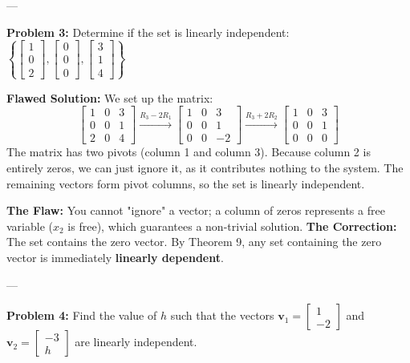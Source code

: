 \documentclass[11pt]{article}
\begin{document}
---

\textbf{Problem 3:} Determine if the set is linearly independent: 
$\left\{ \begin{bmatrix} 1 \\ 0 \\ 2 \end{bmatrix}, \begin{bmatrix} 0 \\ 0 \\ 0 \end{bmatrix}, \begin{bmatrix} 3 \\ 1 \\ 4 \end{bmatrix} \right\}$

\textbf{Flawed Solution:}
We set up the matrix:
\[
\begin{bmatrix}
1 & 0 & 3 \\
0 & 0 & 1 \\
2 & 0 & 4 
\end{bmatrix}
\xrightarrow{R_3 - 2R_1}
\begin{bmatrix}
1 & 0 & 3 \\
0 & 0 & 1 \\
0 & 0 & -2 
\end{bmatrix}
\xrightarrow{R_3 + 2R_2}
\begin{bmatrix}
1 & 0 & 3 \\
0 & 0 & 1 \\
0 & 0 & 0 
\end{bmatrix}
\]
The matrix has two pivots (column 1 and column 3). Because column 2 is entirely zeros, we can just ignore it, as it contributes nothing to the system. The remaining vectors form pivot columns, so the set is linearly independent.

\vspace{0.5cm}
\textbf{The Flaw:} You cannot "ignore" a vector; a column of zeros represents a free variable ($x_2$ is free), which guarantees a non-trivial solution.
\textbf{The Correction:} The set contains the zero vector. By Theorem 9, any set containing the zero vector is immediately \textbf{linearly dependent}.

---

\textbf{Problem 4:} Find the value of $h$ such that the vectors $\mathbf{v}_1 = \begin{bmatrix} 1 \\ -2 \end{bmatrix}$ and $\mathbf{v}_2 = \begin{bmatrix} -3 \\ h \end{bmatrix}$ are linearly independent.
\end{document}
